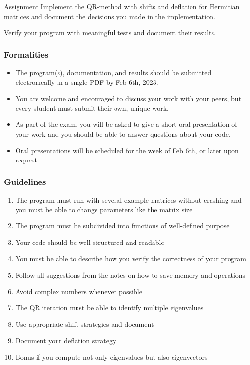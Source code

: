 
\begin{frame}
  \begin{block}{Assignment}
    Implement the QR-method with shifts and deflation for Hermitian
    matrices and document the decisions you made in the implementation.
    
    Verify your program with meaningful tests and document their results.
  \end{block}
\end{frame}

\begin{frame}
  \frametitle{Formalities}
  \begin{itemize}
  \item The program(s), documentation, and results should be submitted
    electronically in a single PDF by Feb 6th, 2023.
  \item You are welcome and encouraged to discuss your work with your
    peers, but every student must submit their own, unique work.
  \item  As part of the exam, you will be asked to give a short oral
    presentation of your work and you should be able to answer questions
    about your code.
  \item Oral presentations will be scheduled for the week of
    Feb 6th, or later upon request.
  \end{itemize}
\end{frame}

\begin{frame}
  \frametitle{Guidelines}
  \begin{enumerate}
  \item The program must run with several example matrices without
    crashing and you must be able to change parameters like the matrix
    size
  \item The program must be subdivided into functions of well-defined
    purpose
  \item Your code should be well structured and readable
  \item You must be able to describe how you verify the correctness of
    your program
  \item Follow all suggestions from the notes on how to save memory and operations
  \item Avoid complex numbers whenever possible
  \item The QR iteration must be able to identify multiple eigenvalues
  \item Use appropriate shift strategies and document
  \item Document your deflation strategy
  \item Bonus if you compute not only eigenvalues but also eigenvectors
  \end{enumerate}
\end{frame}

